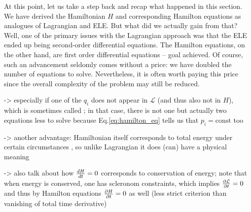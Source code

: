 \documentclass[../class_mech_main.tex]{subfiles}
\begin{document}


At this point, let us take a step back and recap what happened in this section. We have derived the Hamiltonian $H$ and corresponding Hamilton equations as analogues of Lagrangian and ELE. But what did we actually gain from that? Well, one of the primary issues with the Lagrangian approach was that the ELE ended up being second-order differential equations. The Hamilton equations, on the other hand, are first order differential equations -- goal achieved. Of course, such an advancement seldomly comes without a price: we have doubled the number of equations to solve. Nevertheless, it is often worth paying this price since the overall complexity of the problem may still be reduced.

-> especially if one of the $q_i$ does not appear in $\mathcal{L}$ (and thus also not in $H$), which is sometimes called ; in that case, there is not one but actually two equations less to solve because Eq.\eqref{eq:hamilton_eq} tells us that $p_i = \text{const}$ too



-> another advantage: Hamiltonian itself corresponds to total energy under certain circumstances , so unlike Lagrangian it does (can) have a physical meaning

-> also talk about how $\dv{H}{t} = 0$ corresponds to conservation of energy; note that when energy is conserved, one has scleronom constraints, which implies $\pdv{\mathcal{L}}{t} = 0$ and thus by Hamilton equations $\pdv{H}{t} = 0$ as well (less strict criterion than vanishing of total time derivative)
\end{document}
